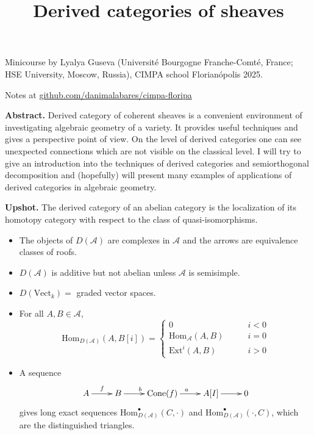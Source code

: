


\title{Derived categories of sheaves}
\maketitle

\noindent
Minicourse by Lyalya Guseva (Universit\'e
Bourgogne Franche-Comt\'e, France; HSE
University, Moscow, Russia), CIMPA school
Florian\'opolis 2025.

\medskip\noindent
Notes at
\href{%
http://github.com/danimalabares/cimpa-floripa
}{%
github.com/danimalabares/cimpa-floripa
}

\bigskip\noindent

{\bf Abstract.} Derived category of coherent
sheaves is a convenient environment of
investigating algebraic geometry of a
variety. It provides useful techniques and
gives a perspective point of view. On the
level of derived categories one can see
unexpected connections which are not visible
on the classical level. I will try to give an
introduction into the techniques of derived
categories and semiorthogonal decomposition
and (hopefully) will present many examples of
applications of derived categories in
algebraic geometry.

\tableofcontents

{\bf Upshot.} The derived category of an
abelian category is the localization of its
homotopy category with respect to the class
of quasi-isomorphisms.
\begin{itemize}
\item The objects of $D(\mathcal{A})$ are
complexes in $\mathcal{A}$ and the
arrows are equivalence classes of roofs.
\item $D(\mathcal{A})$ is additive but not
abelian unless $\mathcal{A}$ is
semisimple.
\item $D(\text{Vect}_k)=$ graded vector
spaces.
\item For all $A,B\in \mathcal{A}$,
$$
\text{Hom}_{D(\mathcal{A})}(A,B[i])=
\begin{cases}
0\qquad &i<0 \\
\text{Hom}_{\mathcal{A}}(A,B)\qquad &i=0\\
\text{Ext}^i(A,B)\qquad &i>0
\end{cases}
$$
\item A sequence
$$
\xymatrix{
A\ar[r]^f&B\ar[r]^b&\text{Cone}(f)\ar[r]^a&
A[I]\ar[r]&0
}
$$
gives long exact sequences
$\text{Hom}^\bullet_{D(\mathcal{A})}(C,\cdot)
$
and
$\text{Hom}^\bullet_{D(\mathcal{A})}(\cdot,C)
$,
which are the distinguished triangles.
\end{itemize}

